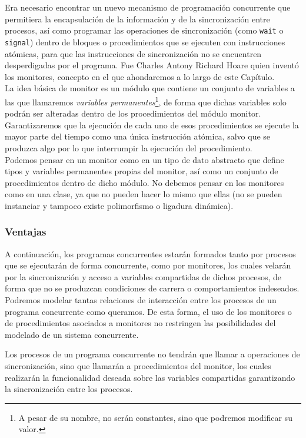 Era necesario encontrar un nuevo mecanismo de programación concurrente que permitiera la encapsulación de la información y de la sincronización entre procesos, así como programar las operaciones de sincronización (como \verb|wait| o \verb|signal|) dentro de bloques o procedimientos que se ejecuten con instrucciones atómicas, para que las instrucciones de sincronización no se encuentren desperdigadas por el programa.
Fue Charles Antony Richard Hoare quien inventó los monitores, concepto en el que ahondaremos a lo largo de este Capítulo.\\

La idea básica de monitor es un módulo que contiene un conjunto de variables a las que llamaremos \textit{variables permanentes}\footnote{A pesar de su nombre, no serán constantes, sino que podremos modificar su valor.}, de forma que dichas variables solo podrán ser alteradas dentro de los procedimientos del módulo monitor. Garantizaremos que la ejecución de cada uno de esos procedimientos se ejecute la mayor parte del tiempo como una única instrucción atómica, salvo que se produzca algo por lo que interrumpir la ejecución del procedimiento.\\

Podemos pensar en un monitor como en un tipo de dato abstracto que define tipos y variables permanentes propias del monitor, así como un conjunto de procedimientos dentro de dicho módulo. No debemos pensar en los monitores como en una clase, ya que no pueden hacer lo mismo que ellas (no se pueden instanciar y tampoco existe polimorfismo o ligadura dinámica).

\subsubsection{Ventajas}
A continuación, los programas concurrentes estarán formados tanto por procesos que se ejecutarán de forma concurrente, como por monitores, los cuales velarán por la sincronización y acceso a variables compartidas de dichos procesos, de forma que no se produzcan condiciones de carrera o comportamientos indeseados. Podremos modelar tantas relaciones de interacción entre los procesos de un programa concurrente como queramos. De esta forma, el uso de los monitores o de procedimientos asociados a monitores no restringen las posibilidades del modelado de un sistema concurrente. 

Los procesos de un programa concurrente no tendrán que llamar a operaciones de sincronización, sino que llamarán a procedimientos del monitor, los cuales realizarán la funcionalidad deseada sobre las variables compartidas garantizando la sincronización entre los procesos.\\

